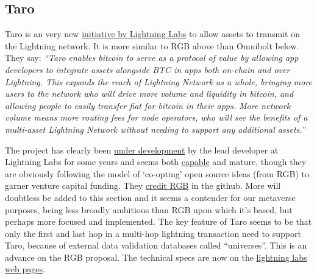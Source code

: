 \subsection{Taro}
Taro is an very new \href{https://lightning.engineering/posts/2022-4-5-taro-launch/}{initiative by Lightning Labs} to allow assets to transmit on the Lightning network. It is more similar to RGB above than Omnibolt below. They say: \textit{``Taro enables bitcoin to serve as a protocol of value by allowing app developers to integrate assets alongside BTC in apps both on-chain and over Lightning. This expands the reach of Lightning Network as a whole, bringing more users to the network who will drive more volume and liquidity in bitcoin, and allowing people to easily transfer fiat for bitcoin in their apps. More network volume means more routing fees for node operators, who will see the benefits of a multi-asset Lightning Network without needing to support any additional assets.''}\par
The project has clearly been \href{https://github.com/roasbeef/bips/tree/bip-taro}{under development} by the lead developer at Lightning Labs for some years and seems both \href{https://lightninglabs.substack.com/p/bitcoinizing-the-dollar-and-the-world?s=r}{capable} and mature, though they are obviously following the model of `co-opting' open source ideas (from RGB) to garner venture capital funding. They \href{https://github.com/bitcoin/bips/pull/1298/commits/4daba8c373c777defb48136795382803c137502c}{credit RGB} in the github. More will doubtless be added to this section and it seems a contender for our metaverse purposes, being less broadly ambitious than RGB upon which it's based, but perhaps more focused and implemented. The key feature of Taro seems to be that only the first and last hop in a multi-hop lightning transaction need to support Taro, because of external data validation databases called ``universes''. This is an advance on the RGB proposal. 
The technical specs are now on the \href{https://docs.lightning.engineering/the-lightning-network/taro}{lightning labs web pages}.
